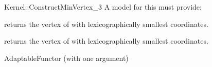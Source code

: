 \begin{ccRefFunctionObjectConcept}{Kernel::ConstructMinVertex_3}
A model for this must provide:


 {returns the vertex of
   with lexicographically smallest coordinates.}

 {returns the vertex of
   with lexicographically smallest coordinates.}

\ccRefines
AdaptableFunctor (with one argument)

\ccSeeAlso
{}\\

\end{ccRefFunctionObjectConcept}

